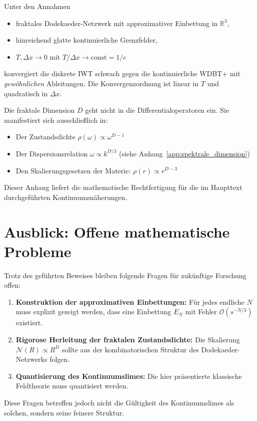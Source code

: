 Unter den Annahmen

\begin{itemize}
    \item fraktales Dodekaeder-Netzwerk mit approximativer Einbettung in \( \mathbb{R}^3 \),
    \item hinreichend glatte kontinuierliche Grenzfelder,
    \item \( T, \Delta x \to 0 \) mit \( T/\Delta x \to \text{const} = 1/c \)
\end{itemize}

konvergiert die diskrete IWT schwach gegen die kontinuierliche WDBT+ mit
\emph{gewöhnlichen} Ableitungen. Die Konvergenzordnung ist linear in \( T \) und
quadratisch in \( \Delta x \).

Die fraktale Dimension \( D \) geht nicht in die Differentialoperatoren ein.
Sie manifestiert sich ausschließlich in:

\begin{itemize}
    \item Der Zustandsdichte \( \rho(\omega) \propto \omega^{D-1} \)
    \item Der Dispersionsrelation \( \omega \propto k^{D/3} \) (siehe Anhang~\ref{app:spektrale_dimension})
    \item Den Skalierungsgesetzen der Materie: \( \rho(r) \propto r^{D-3} \)
\end{itemize}

Dieser Anhang liefert die mathematische Rechtfertigung für die im Haupttext
durchgeführten Kontinuumsnäherungen.

\section{Ausblick: Offene mathematische Probleme}
\label{app:kontinuumslimes_ausblick}

Trotz des geführten Beweises bleiben folgende Fragen für zukünftige Forschung offen:

\begin{enumerate}
    \item \textbf{Konstruktion der approximativen Einbettungen:}
          Für jedes endliche \( N \) muss explizit gezeigt werden, dass eine Einbettung
          \( E_N \) mit Fehler \( \mathcal{O}(s^{-N/3}) \) existiert.
    \item \textbf{Rigorose Herleitung der fraktalen Zustandsdichte:}
          Die Skalierung \( \mathcal{N}(R) \propto R^D \) sollte aus der kombinatorischen
          Struktur des Dodekaeder-Netzwerks folgen.
    \item \textbf{Quantisierung des Kontinuumslimes:}
          Die hier präsentierte klassische Feldtheorie muss quantisiert werden.
\end{enumerate}

Diese Fragen betreffen jedoch nicht die Gültigkeit des Kontinuumslimes als solchen,
sondern seine feinere Struktur.